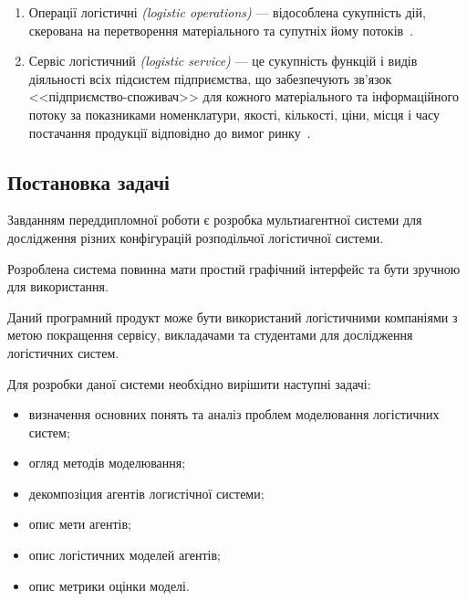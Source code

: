 \begin{enumerate}
	\item Операції логістичні \textit{(logistic operations)} --- відособлена сукупність дій, скерована на перетворення матеріального та супутніх йому потоків~\cite{Kusluy2010}.
	\item Сервіс логістичний \textit{(logistic service)} --- це сукупність функцій і видів діяльності всіх підсистем підприємства, що забезпечують зв’язок <<підприємство-споживач>> для кожного матеріального та інформаційного потоку за показниками номенклатури, якості, кількості, ціни, місця і часу постачання продукції відповідно до вимог ринку~\cite{Kusluy2010}.
\end{enumerate}

\subsection{Постановка задачі}
Завданням переддипломної роботи є розробка мультиагентної системи для дослідження різних конфігурацій розподільчої логістичної системи.

Розроблена система повинна мати простий графічний інтерфейс та бути зручною для використання.

Даний програмний продукт може бути використаний логістичними компаніями з метою покращення сервісу, викладачами та студентами для дослідження логістичних систем.

Для розробки даної системи необхідно вирішити наступні задачі:
\begin{itemize}
	\item визначення основних понять та аналіз проблем моделювання логістичних систем;
	\item огляд методів моделювання;
	\item декомпозіция агентів логистічної системи;
	\item опис мети агентів;
	\item опис логістичних моделей агентів;
	\item опис метрики оцінки моделі.
\end{itemize}
